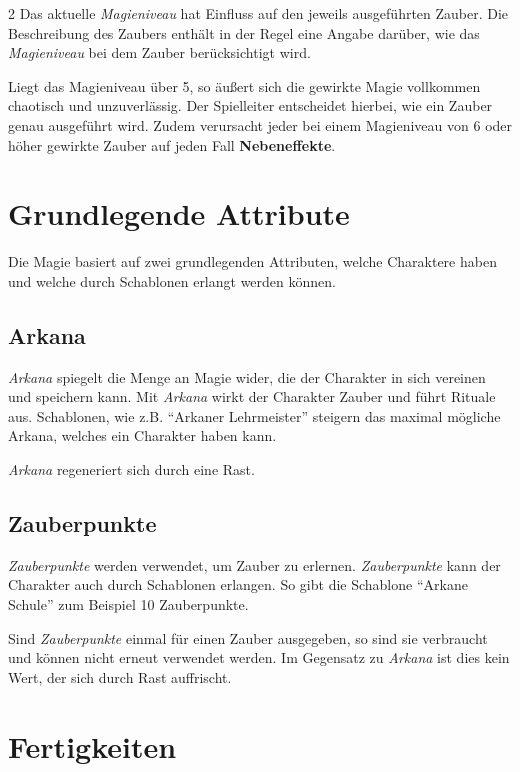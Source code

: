 \begin{multicols}{2}
Das aktuelle \textit{Magieniveau} hat Einfluss auf den jeweils ausgeführten Zauber. Die Beschreibung des Zaubers enthält in der Regel eine Angabe darüber, wie das \textit{Magieniveau} bei dem Zauber berücksichtigt wird.

Liegt das Magieniveau über 5, so äußert sich die gewirkte Magie vollkommen chaotisch und unzuverlässig. Der Spielleiter entscheidet hierbei, wie ein Zauber genau ausgeführt wird. Zudem verursacht jeder bei einem Magieniveau von 6 oder höher gewirkte Zauber auf jeden Fall \textbf{Nebeneffekte}.

\section{Grundlegende Attribute}

Die Magie basiert auf zwei grundlegenden Attributen, welche Charaktere haben und welche durch Schablonen erlangt werden können.

\subsection{Arkana}

\textit{Arkana} spiegelt die Menge an Magie wider, die der Charakter in sich vereinen und speichern kann. Mit \textit{Arkana} wirkt der Charakter Zauber und führt Rituale aus. Schablonen, wie z.B. ``Arkaner Lehrmeister'' steigern das maximal mögliche Arkana, welches ein Charakter haben kann.

\textit{Arkana} regeneriert sich durch eine Rast.

\subsection{Zauberpunkte}

\textit{Zauberpunkte} werden verwendet, um Zauber zu erlernen. \textit{Zauberpunkte} kann der Charakter auch durch Schablonen erlangen. So gibt die Schablone ``Arkane Schule'' zum Beispiel 10 Zauberpunkte.

Sind \textit{Zauberpunkte} einmal für einen Zauber ausgegeben, so sind sie verbraucht und können nicht erneut verwendet werden. Im Gegensatz zu \textit{Arkana} ist dies kein Wert, der sich durch Rast auffrischt.

\section{Fertigkeiten}


\end{multicols}
